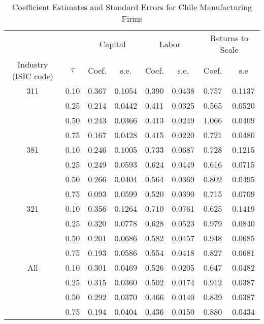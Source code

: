 \begin{table}[ht]
\centering
\caption{Coefficient Estimates and Standard Errors for Chile Manufacturing Firms} 
\begin{tabular}{cccccccc}
  \hline\hline & & \multicolumn{2}{c}{Capital}  & \multicolumn{2}{c}{Labor} & \multicolumn{2}{c}{Returns to Scale} \\ \cmidrule(lr){3-4} \cmidrule(lr){5-6} \cmidrule(lr){7-8}Industry (ISIC code) & $\tau$ & Coef. & s.e. & Coef. & s.e. & Coef. & s.e \\ 
  \hline
311 & 0.10 & 0.367 & 0.1054 & 0.390 & 0.0438 & 0.757 & 0.1137 \\ 
   & 0.25 & 0.214 & 0.0442 & 0.411 & 0.0325 & 0.565 & 0.0520 \\ 
   & 0.50 & 0.243 & 0.0366 & 0.413 & 0.0249 & 1.066 & 0.0409 \\ 
   & 0.75 & 0.167 & 0.0428 & 0.415 & 0.0220 & 0.721 & 0.0480 \\ 
  381 & 0.10 & 0.246 & 0.1005 & 0.733 & 0.0687 & 0.728 & 0.1215 \\ 
   & 0.25 & 0.249 & 0.0593 & 0.624 & 0.0449 & 0.616 & 0.0715 \\ 
   & 0.50 & 0.266 & 0.0404 & 0.564 & 0.0369 & 0.802 & 0.0495 \\ 
   & 0.75 & 0.093 & 0.0599 & 0.520 & 0.0390 & 0.715 & 0.0709 \\ 
  321 & 0.10 & 0.356 & 0.1264 & 0.710 & 0.0761 & 0.625 & 0.1419 \\ 
   & 0.25 & 0.320 & 0.0778 & 0.628 & 0.0523 & 0.979 & 0.0840 \\ 
   & 0.50 & 0.201 & 0.0686 & 0.582 & 0.0457 & 0.948 & 0.0685 \\ 
   & 0.75 & 0.193 & 0.0586 & 0.554 & 0.0418 & 0.827 & 0.0681 \\ 
  All & 0.10 & 0.301 & 0.0469 & 0.526 & 0.0205 & 0.647 & 0.0482 \\ 
   & 0.25 & 0.315 & 0.0360 & 0.502 & 0.0174 & 0.912 & 0.0387 \\ 
   & 0.50 & 0.292 & 0.0370 & 0.466 & 0.0140 & 0.839 & 0.0387 \\ 
   & 0.75 & 0.194 & 0.0404 & 0.436 & 0.0150 & 0.880 & 0.0434 \\ 
   \hline
\end{tabular}
\end{table}
